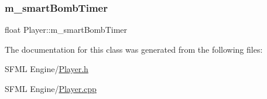 \subsubsection{\texorpdfstring{m\+\_\+smart\+Bomb\+Timer}{m\_smartBombTimer}}
{\footnotesize\ttfamily float Player\+::m\+\_\+smart\+Bomb\+Timer}



The documentation for this class was generated from the following files\+:\begin{DoxyCompactItemize}
\item 
S\+F\+M\+L Engine/\hyperlink{_player_8h}{Player.\+h}\item 
S\+F\+M\+L Engine/\hyperlink{_player_8cpp}{Player.\+cpp}\end{DoxyCompactItemize}
